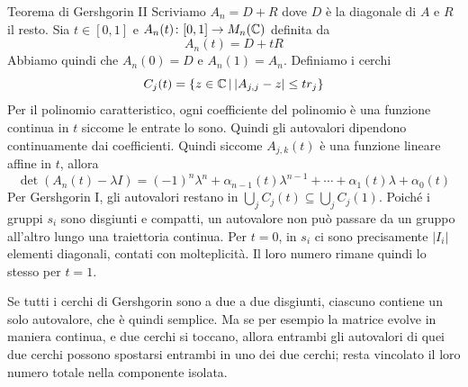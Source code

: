 \documentclass[a4paper]{article}
\begin{document}
\begin{snippetproof}{Teorema di Gershgorin II}
    Scriviamo \(A_n = D + R\) dove \(D\) è la diagonale di \(A\) e \(R\) il resto.
    Sia \(t \in [0,1]\)
    e \(A_n(t) \colon [0,1] \to M_n(\mathbb{C})\) definita da
    \[
        A_n(t) = D + tR
    \]
    Abbiamo quindi che \(A_n(0) = D\) e \(A_n(1) = A_n\).
    Definiamo i cerchi
    \[
        C_j(t) = \left\{
            z \in \mathbb{C}
            \,|\,
            |A_{j,j} - z| \leq t r_j
        \right\}
    \]
    Per il polinomio caratteristico, ogni coefficiente del polinomio è una funzione
    continua in \(t\) siccome le entrate lo sono. Quindi gli autovalori dipendono continuamente
    dai coefficienti. Quindi siccome \(A_{j,k}(t)\) è una funzione lineare affine in \(t\),
    allora \[
        \det(A_n(t) - \lambda I) = (-1)^n \lambda^n +
        \alpha_{n-1}(t)\lambda^{n-1} + \cdots + \alpha_1(t)\lambda + \alpha_0(t)
    \]
    Per Gershgorin I, gli autovalori restano in \(\bigcup_j C_j(t)\subseteq\bigcup_j C_j(1)\).
    Poiché i gruppi \(s_i\) sono disgiunti e compatti, un autovalore non può passare da un gruppo all'altro lungo una traiettoria continua.
    Per \(t=0\), in \(s_i\) ci sono precisamente \(|I_i|\) elementi diagonali, contati con molteplicità. Il loro numero rimane quindi lo stesso per \(t=1\).
\end{snippetproof}

Se tutti i cerchi di Gershgorin sono a due a due disgiunti, ciascuno contiene un solo autovalore, che è quindi semplice.
Ma se per esempio la matrice evolve in maniera continua, e due cerchi si toccano,
allora entrambi gli autovalori di quei due cerchi possono
spostarsi entrambi in uno dei due cerchi; resta vincolato il loro numero totale nella componente isolata.
\end{document}
